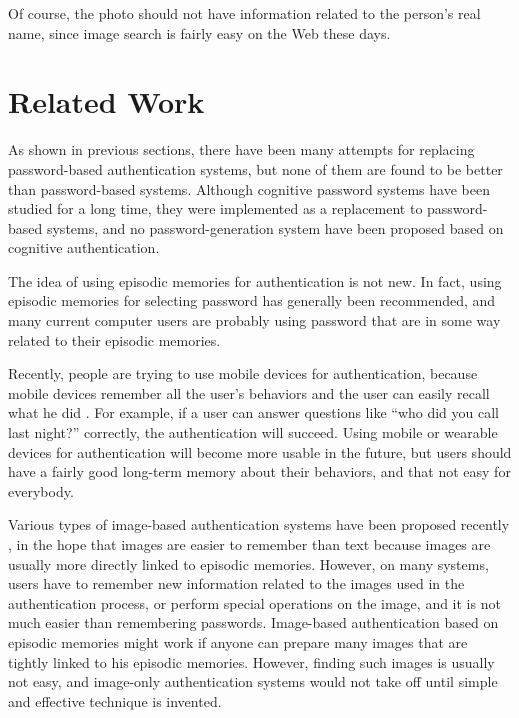 \documentclass[runningheads,a4paper]{llncs}
\begin{document}
Of course, the photo should not have information related to the
person's real name, since image search is fairly easy on the Web these days.

\section{Related Work}


As shown in previous sections,
there have been many attempts for replacing password-based authentication systems,
but none of them are found to be better than
password-based systems\cite{Bonneau:ReplacePasswords}.
%
Although cognitive password systems have been studied for a
long time\cite{Lazar2011}\cite{Zviran:1990:UAC:100512.100538},
they were implemented as a replacement to password-based systems,
and no password-generation system have been proposed
based on cognitive authentication.


The idea of using episodic memories for authentication is not new.
In fact, using episodic memories for selecting password
has generally been recommended,
and many current computer users are probably using password that are
in some way related to their episodic memories.

Recently, people are trying to use mobile devices for authentication,
because mobile devices remember all the user's behaviors and
the user can easily recall what he did%
\cite{Dandapat:2015:AYD:2702123.2702457}%
\cite{Das:2013:ECE:2493432.2493453}%
\cite{GuptaWRLGB12}%
.
For example, if a user can answer questions like
``who did you call last night?'' correctly, the authentication will succeed.
Using mobile or wearable devices for authentication will become more usable
in the future,
but users should have a fairly good long-term memory about their behaviors,
and that not easy for everybody.

Various types of image-based authentication systems have been proposed recently%
\cite{Biddle:2012:GPL:2333112.2333114}\cite{GraphicalPasswords},
in the hope that images are easier to remember than text
because images are usually more directly linked to episodic memories.
However, on many systems,
users have to remember new information related to the images
used in the authentication process, or
perform special operations on the image, and
it is not much easier than remembering passwords.
%
Image-based authentication based on episodic memories might work
if anyone can prepare many images 
that are tightly linked to his episodic memories.
However, finding such images is usually not easy, and
image-only authentication systems would not take off
until simple and effective technique is invented.
\end{document}
